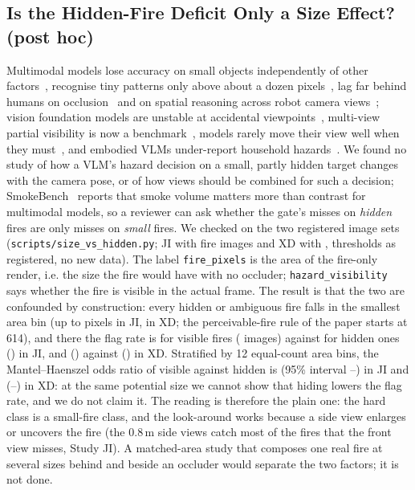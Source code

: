 \subsection{Is the Hidden-Fire Deficit Only a Size Effect? (post hoc)}\label{sec:moved-sizehidden}
Multimodal models lose accuracy on small objects independently of other factors~\cite{zhang2024perceptuallimit}, recognise tiny patterns only above about a dozen pixels~\cite{li2026lastpixel}, lag far behind humans on occlusion~\cite{liu2025obench} and on spatial reasoning across robot camera views~\cite{feng2025mvrobobench}; vision foundation models are unstable at accidental viewpoints~\cite{michalkiewicz2024viewpoint}, multi-view partial visibility is now a benchmark~\cite{lee2025spatialmosaic}, models rarely move their view well when they must~\cite{wang2024actiview}, and embodied VLMs under-report household hazards~\cite{yao2025homesafebench}. We found no study of how a VLM's hazard decision on a small, partly hidden target changes with the camera pose, or of how views should be combined for such a decision; SmokeBench~\cite{qi2026smokebench} reports that smoke volume matters more than contrast for multimodal models, so a reviewer can ask whether the gate's misses on \emph{hidden} fires are only misses on \emph{small} fires. We checked on the two registered image sets (\texttt{scripts/size\_vs\_hidden.py}; JI with \SHJIN{} fire images and XD with \SHXDN{}, thresholds as registered, no new data). The label \texttt{fire\_pixels} is the area of the fire-only render, i.e. the size the fire would have with no occluder; \texttt{hazard\_visibility} says whether the fire is visible in the actual frame. The result is that the two are confounded by construction: every hidden or ambiguous fire falls in the smallest area bin (up to \SHJIMax{} pixels in JI, \SHXDMax{} in XD; the perceivable-fire rule of the paper starts at 614), and there the flag rate is \SHJIVis{} for visible fires (\SHJIVisN{} images) against \SHJIHid{} for hidden ones (\SHJIHidN{}) in JI, and \SHXDVis{} (\SHXDVisN{}) against \SHXDHid{} (\SHXDHidN{}) in XD. Stratified by 12 equal-count area bins, the Mantel--Haenszel odds ratio of visible against hidden is \SHJIOR{} (95\% interval \SHJIORLow--\SHJIORHigh) in JI and \SHXDOR{} (\SHXDORLow--\SHXDORHigh) in XD: at the same potential size we cannot show that hiding lowers the flag rate, and we do not claim it. The reading is therefore the plain one: the hard class is a small-fire class, and the look-around works because a side view enlarges or uncovers the fire (the 0.8\,m side views catch most of the fires that the front view misses, Study JI). A matched-area study that composes one real fire at several sizes behind and beside an occluder would separate the two factors; it is not done.
